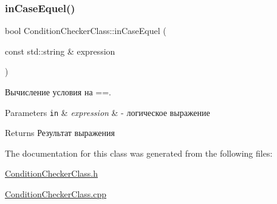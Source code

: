 \subsubsection{\texorpdfstring{in\+Case\+Equel()}{inCaseEquel()}}
{\footnotesize\ttfamily bool Condition\+Checker\+Class\+::in\+Case\+Equel (\begin{DoxyParamCaption}\item[{const std\+::string \&}]{expression }\end{DoxyParamCaption})\hspace{0.3cm}{\ttfamily [private]}}



Вычисление условия на ==. 


\begin{DoxyParams}[1]{Parameters}
\mbox{\tt in}  & {\em expression} & -\/ логическое выражение \\
\hline
\end{DoxyParams}
\begin{DoxyReturn}{Returns}
Результат выражения 
\end{DoxyReturn}


The documentation for this class was generated from the following files\+:\begin{DoxyCompactItemize}
\item 
\hyperlink{_condition_checker_class_8h}{Condition\+Checker\+Class.\+h}\item 
\hyperlink{_condition_checker_class_8cpp}{Condition\+Checker\+Class.\+cpp}\end{DoxyCompactItemize}
